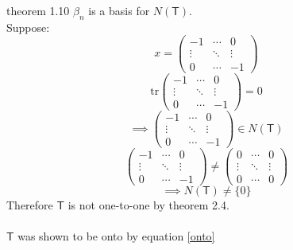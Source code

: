 \begin{enumerate}[(a)]
theorem 1.10 $\beta_n$ is a basis for $N(\mathsf{T})$.
\\Suppose: \[x =\begin{pmatrix}
-1&\cdots&0\\
 \vdots&\ddots&\vdots\\
0&\cdots&-1
\end{pmatrix} \]
\begin{equation}
\text{tr}\begin{pmatrix}
-1&\cdots&0\\
 \vdots&\ddots&\vdots\\
0&\cdots&-1
\end{pmatrix}=0
\end{equation}
\begin{equation}
\implies \begin{pmatrix}
-1&\cdots&0\\
 \vdots&\ddots&\vdots\\
0&\cdots&-1
\end{pmatrix} \in N(\mathsf{T})
\end{equation}
\begin{equation}
\begin{pmatrix}
-1&\cdots&0\\
 \vdots&\ddots&\vdots\\
0&\cdots&-1
\end{pmatrix} \neq 
\begin{pmatrix}
0&\cdots&0\\
 \vdots&\ddots&\vdots\\
0&\cdots&0
\end{pmatrix}
\end{equation}
\begin{equation}
\implies N(\mathsf{T}) \neq \{0\}
\end{equation}
Therefore $\mathsf{T}$ is not one-to-one by theorem 2.4.
\paragraph{}
$\mathsf{T}$ was shown to be onto by equation \ref{onto}
\end{enumerate}
